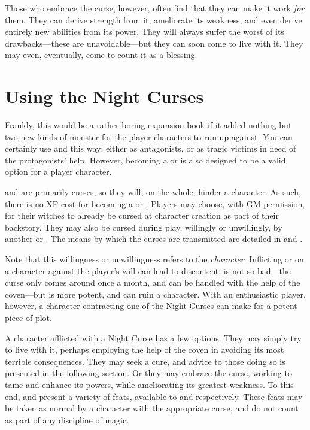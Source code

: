 Those who embrace the curse, however, often find that they can make it work \emph{for} them.
They can derive strength from it, ameliorate its weakness, and even derive entirely new abilities from its power.
They will always suffer the worst of its drawbacks---these are unavoidable---but they can soon come to live with it.
They may even, eventually, come to count it as a blessing.

\section{Using the Night Curses}

Frankly, this would be a rather boring expansion book if it added nothing but two new kinds of monster for the player characters to run up against.
You can certainly use {\vampires} and {\werewolves} this way; either as antagonists, or as tragic victims in need of the protagonists' help.
However, becoming a {\vampire} or {\werewolf} is also designed to be a valid option for a player character.

{\lycanthropy} and {\vampirism} are primarily curses, so they will, on the whole, hinder a character.
As such, there is no XP cost for becoming a {\werewolf} or {\vampire}.
Players may choose, with GM permission, for their witches to already be cursed at character creation as part of their backstory.
They may also be cursed during play, willingly or unwillingly, by another {\vampire} or {\werewolf}.
The means by which the curses are transmitted are detailed in  and .

Note that this willingness or unwillingness refers to the \emph{character}.
Inflicting {\lycanthropy} or {\vampirism} on a character against the player's will can lead to discontent.
{\lycanthropy} is not so bad---the curse only comes around once a month, and can be handled with the help of the coven---but {\vampirism} is more potent, and can ruin a character.
With an enthusiastic player, however, a character contracting one of the Night Curses can make for a potent piece of plot.

A character afflicted with a Night Curse has a few options.
They may simply try to live with it, perhaps employing the help of the coven in avoiding its most terrible consequences.
They may seek a cure, and advice to those doing so is presented in the following section.
Or they may embrace the curse, working to tame and enhance its powers, while ameliorating its greatest weakness.
To this end,  and  present a variety of feats, available to {\werewolves} and {\vampires} respectively.
These feats may be taken as normal by a character with the appropriate curse, and do not count as part of any discipline of magic.

